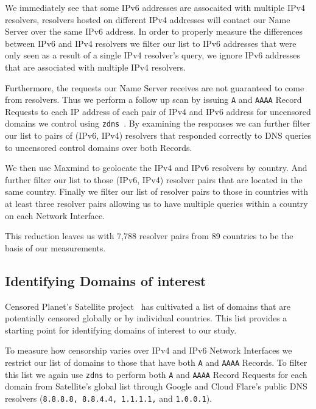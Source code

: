 We immediately see that some IPv6 addresses are assocaited with multiple IPv4
resolvers, \ie resolvers hosted on different IPv4 addresses will contact our Name
Server over the same IPv6 address. In order to properly measure the differences
between IPv6 and IPv4 resolvers we filter our list to IPv6 addresses that were
only seen as a result of a single IPv4 resolver's query, \ie we ignore IPv6
addresses that are associated with multiple IPv4 resolvers.

Furthermore, the requests our Name Server receives are not guaranteed to come
from resolvers. Thus we perform a follow up scan by issuing \texttt{A} and
\texttt{AAAA} Record Requests to each IP address of each pair of IPv4 and IPv6
address for uncensored domains we control using
\texttt{zdns}~\cite{Durumeric13zmap}. By examining the responses we can further
filter our list to pairs of (IPv6, IPv4) resolvers that responded correctly to
DNS queries to uncensored control domains over both Records.

We then use Maxmind to geolocate the IPv4 and IPv6 resolvers by
country. And further filter our list to those (IPv6, IPv4) resolver pairs that
are located in the same country. Finally we filter our list of resolver pairs to
those in countries with at least three resolver pairs allowing us to have
multiple queries within a country on each Network Interface.

This reduction leaves us with 7,788 resolver pairs from 89 countries to be the
basis of our measurements.


\subsection{Identifying Domains of interest}\label{ssec:censored-domains}

Censored Planet's Satellite project~\cite{sundara2020censored} has cultivated a
list of domains that are potentially censored globally or by individual
countries. This list provides a starting point for identifying domains of
interest to our study.

To measure how censorship varies over IPv4 and IPv6 Network Interfaces we
restrict our list of domains to those that have both \texttt{A} and
\texttt{AAAA} Records. To filter this list we again use \texttt{zdns} to perform
both \texttt{A} and \texttt{AAAA} Record Requests for each domain from
Satellite's global list through Google and Cloud Flare's public DNS resolvers
(\texttt{8.8.8.8, 8.8.4.4, 1.1.1.1,} and \texttt{1.0.0.1}).


